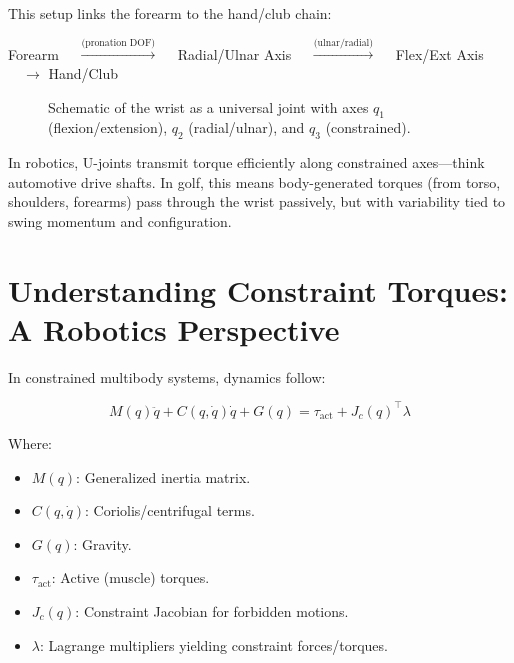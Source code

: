 \documentclass[11pt]{article}
\begin{document}
This setup links the forearm to the hand/club chain:

Forearm $\quad \overset{\text{(pronation DOF)}}{\longrightarrow} \quad$ Radial/Ulnar Axis $\quad \overset{\text{(ulnar/radial)}}{\longrightarrow} \quad$ Flex/Ext Axis $\quad \longrightarrow$ Hand/Club

\begin{figure}[h]
\centering
{}
\caption{Schematic of the wrist as a universal joint with axes $q_1$ (flexion/extension), $q_2$ (radial/ulnar), and $q_3$ (constrained).}
\label{fig:wrist_model}
\end{figure}

In robotics, U-joints transmit torque efficiently along constrained axes—think automotive drive shafts. In golf, this means body-generated torques (from torso, shoulders, forearms) pass through the wrist passively, but with variability tied to swing momentum and configuration.

\section{Understanding Constraint Torques: A Robotics Perspective}

In constrained multibody systems, dynamics follow:

\begin{equation}
    M(q)\ddot{q} + C(q,\dot{q})\dot{q} + G(q) = \tau_{\text{act}} + J_c(q)^\top \lambda
    \label{eq:dyn_full}
\end{equation}

Where:
\begin{itemize}
    \item $M(q)$: Generalized inertia matrix.
    \item $C(q,\dot{q})$: Coriolis/centrifugal terms.
    \item $G(q)$: Gravity.
    \item $\tau_{\text{act}}$: Active (muscle) torques.
    \item $J_c(q)$: Constraint Jacobian for forbidden motions.
    \item $\lambda$: Lagrange multipliers yielding constraint forces/torques.
\end{itemize}
\end{document}
